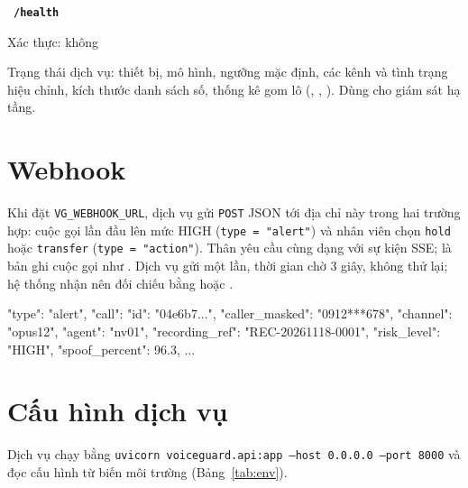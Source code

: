 \documentclass[11pt]{article}
\newcommand{\method}[2]{\par\smallskip\noindent{\colorbox{#1!12}{\textbf{\texttt{\color{#1!70!black}#2}}}}\ }
\newcommand{\GET}[1]{\method{green}{GET}\texttt{\bfseries #1}\par}
\newcommand{\who}[1]{{\small\color{muted}Xác thực: #1}\par}
\begin{document}
\GET{/health}
\who{không}
Trạng thái dịch vụ: thiết bị, mô hình, ngưỡng mặc định, các kênh và tình trạng hiệu chỉnh, kích thước danh sách số, thống kê gom lô (, , ). Dùng cho giám sát hạ tầng.

\section{Webhook}

Khi đặt \texttt{VG\_WEBHOOK\_URL}, dịch vụ gửi \texttt{POST} JSON tới địa chỉ này trong hai trường hợp: cuộc gọi lần đầu lên mức HIGH (\texttt{type = "alert"}) và nhân viên chọn \texttt{hold} hoặc \texttt{transfer} (\texttt{type = "action"}). Thân yêu cầu cùng dạng với sự kiện SSE;  là bản ghi cuộc gọi như . Dịch vụ gửi một lần, thời gian chờ 3 giây, không thử lại; hệ thống nhận nên đối chiếu bằng  hoặc .
\begin{code}
{ "type": "alert",
  "call": { "id": "04e6b7...", "caller_masked": "0912***678", "channel": "opus12",
            "agent": "nv01", "recording_ref": "REC-20261118-0001",
            "risk_level": "HIGH", "spoof_percent": 96.3, ... } }
\end{code}

\section{Cấu hình dịch vụ}

Dịch vụ chạy bằng \texttt{uvicorn voiceguard.api:app --host 0.0.0.0 --port 8000} và đọc cấu hình từ biến môi trường (Bảng~\ref{tab:env}).
\end{document}
